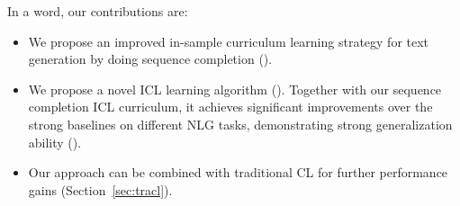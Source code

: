 
%
In a word, our contributions are:
\begin{itemize}
	\item We propose an improved in-sample curriculum learning strategy for text generation by doing sequence completion ().
	\item We propose a novel ICL learning algorithm (). 
Together with our sequence completion ICL curriculum, it achieves significant improvements over 
the strong baselines on different NLG tasks, demonstrating strong generalization ability
().
	\item Our approach can be combined with traditional CL for further performance gains 
(Section~\ref{sec:tracl}). 
\end{itemize}


